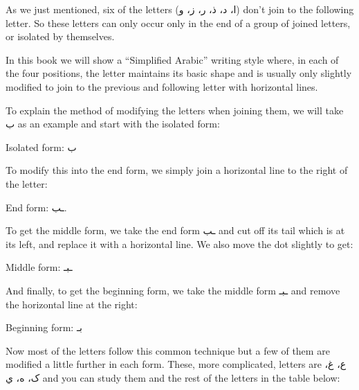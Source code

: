\documentclass[
  10pt,
]{book}
\begin{document}
As we just mentioned, six of the letters (\foreignlanguage{arabic}{ا، د، ذ، ر، ز، و}) don't join to the following letter. So these letters can only occur only in the end of a group of joined letters, or isolated by themselves.

In this book we will show a \enquote{Simplified Arabic} writing style where, in each of the four positions, the letter maintains its basic shape and is usually only slightly modified to join to the previous and following letter with horizontal lines.

To explain the method of modifying the letters when joining them, we will take \foreignlanguage{arabic}{ب} as an example and start with the isolated form:

Isolated form: \foreignlanguage{arabic}{ب}

To modify this into the end form, we simply join a horizontal line to the right of the letter:

End form: \foreignlanguage{arabic}{ـب}.

To get the middle form, we take the end form \foreignlanguage{arabic}{ـب} and cut off its tail which is at its left, and replace it with a horizontal line. We also move the dot slightly to get:

Middle form: \foreignlanguage{arabic}{ـبـ}

And finally, to get the beginning form, we take the middle form \foreignlanguage{arabic}{ـبـ} and remove the horizontal line at the right:

Beginning form: \foreignlanguage{arabic}{بـ}

Now most of the letters follow this common technique but a few of them are modified a little further in each form. These, more complicated, letters are \foreignlanguage{arabic}{ع، غ، ک، ه، ي} and you can study them and the rest of the letters in the table below:
\end{document}
